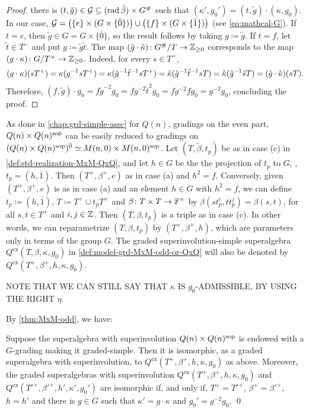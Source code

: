 \begin{proof}
    there is $(t, \tilde g) \in \mathcal G \subseteq (\operatorname{rad} \tilde \beta) \times G^\#$ such that $(\kappa', g_0') = (t, \tilde g) \cdot (\kappa, g_0)$. 
    In our case, $\mathcal G = \big( \{e\} \times (G \times \{ \bar 0 \}) \big) \cup \big( \{f\} \times (G \times \{ \bar 1 \}) \big)$ (see \cref{eq:mathcal-G}). 
    If $t = e$, then $\tilde g \in G = G\times \{ \bar 0 \}$, so the result follows by taking $g \coloneqq \tilde g$. 
    If $t = f$, let $\tilde t \in T^-$ and put $g \coloneqq \tilde g \tilde t$. 
    The map $(\tilde g \cdot \tilde \kappa)\colon G^\#/T \to \mathbb{Z}_{\geq 0}$ corresponds to the map $(g \cdot \kappa)\colon G/T^+ \to \mathbb{Z}_{\geq 0}$. 
    Indeed, for every $s\in T^+$,
    \[
    (g\cdot \kappa) (sT^+) =
    \kappa (g^{-1} sT^+) =
    \kappa (\tilde g^{-1} \tilde t^{-1} sT^+) = 
    \tilde\kappa (\tilde g^{-1} \tilde t^{-1} sT) = 
    \tilde\kappa (\tilde g^{-1} \tilde sT)  =
    (\tilde g \cdot \tilde\kappa)(sT).
    \]
    Therefore, $(f, \tilde g) \cdot g_0 = f \tilde g ^{-2} g_0 = f g ^{-2} \tilde t ^{2} g_0 = fg ^{-2} f g_0 =  g ^{-2} g_0$, concluding the proof. 
\end{proof}

As done in \cref{chap:grd-simple-assc} for $Q(n)$, gradings on the even part, $Q(n)\times Q(n)^{\mathrm{sop}}$ can be easily reduced to gradings on $(Q(n)\times Q(n)^{\mathrm{sop}})^{\bar0} \simeq M(n, 0) \times M(n, 0) ^{\mathrm{sop}}$. 
Let $(T, \tilde\beta, t_p)$ be as in case (c) in \cref{def:std-realization-MxM-QxQ}, and let $h\in G$ be the the projection of $t_p$ to $G$, \ie, $t_p = (h, \bar 1)$. 
Then $(T^+, \beta^+, e)$ as in case (a) and $h^2 = f$. 
Conversely, given $(T^+, \beta^+, e)$ is as in case (a) and an element $h\in G$ with $h^2 = f$, we can define $t_p \coloneqq (h, \bar 1)$, $T \coloneqq T^+ \cup t_p T^+$ and $\beta\colon T\times T \to \mathbb{F}^\times$ by $\beta(s t_p^i, t t_p^j) = \beta(s,t)$, for all $s, t \in T^+$ and $i, j \in \mathbb{Z}$. 
Then $(T, \beta, t_p)$ is a triple as in case (c). 
In other words, we can reparametrize $(T, \beta, t_p)$ by $(T^+, \beta^+, h)$, which are parameters only in terms of the group $G$. 
The graded superinvolution-simple superalgebra $Q^{\mathrm{ex}} (T, \beta, \kappa, g_0)$ in \cref{def:model-grd-MxM-odd-or-QxQ} will also be denoted by $Q^{\mathrm{ex}} (T^+, \beta^+,  h, \kappa, g_0)$. 

NOTE THAT WE CAN STILL SAY THAT $\kappa$ IS $g_0$-ADMISSIBLE, BY USING THE RIGHT $\eta$. 

By \cref{thm:MxM-odd}, we have:

\begin{cor}\label{cor:QxQ-reduced-to-MxM}
    Suppose the superalgebra with superinvolution $Q(n) \times Q(n)^{\mathrm{sop}}$ is endowed with a $G$-grading making it graded-simple. 
    Then it is isomorphic, as a graded superalgebra with superinvolution, to $Q^{\mathrm{ex}}(T^+,\beta^+, h, \kappa, g_0)$ as above. 
    Moreover, the graded superalgebras with superinvolution $Q^{\mathrm{ex}} (T^+, \beta^+,  h, \kappa, g_0)$ and $Q^{\mathrm{ex}} (T'^+, \beta'^+,  h', \kappa', g_0')$ are isomorphic if, and only if, $T^+ =T'^+$, $\beta^+ = \beta'^+$, $h = h'$ and there is $g \in G$ such that $\kappa' = g\cdot\kappa$ and $g_0' = g^{-2}g_0$. \qed
\end{cor}

